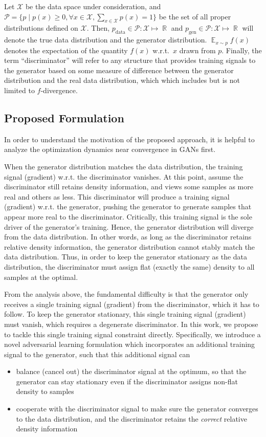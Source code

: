 \documentclass[a4paper]{article}
\newcommand{\pd}{p_\text{data}}
\newcommand{\pg}{p_\text{gen}}
\DeclareMathOperator*{\E}{\mathbb{E}}
\DeclareMathOperator{\R}{\mathbb{R}}
\begin{document}
Let $\mathcal{X}$ be the data space under consideration, and $\mathcal{P} = \{ p \mid p(x) \geq 0, \forall x \in \mathcal{X}, \sum_{x \in \mathcal{X}} p(x) = 1 \}$ be the set of all proper distributions defined on $\mathcal{X}$.
Then, $\pd \in \mathcal{P}: \mathcal{X} \mapsto \R$ and $\pg \in \mathcal{P}: \mathcal{X} \mapsto \R$ will denote the true data distribution and the generator distribution.
$\E_{x \sim p} f(x)$ denotes the expectation of the quantity $f(x)$ w.r.t.~$x$ drawn from $p$.
Finally, the term ``discriminator'' will refer to any structure that provides training signals to the generator based on some measure of difference between the generator distribution and the real data distribution, which which includes but is not limited to $f$-divergence.

\subsection{Proposed Formulation}
In order to understand the motivation of the proposed approach, it is helpful to analyze the optimization dynamics near convergence in GANs first.

When the generator distribution matches the data distribution, 
the training signal (gradient) w.r.t. the discriminator vanishes.
At this point, assume the discriminator still retains density information, and views some samples as more real and others as less.
This discriminator will produce a training signal (gradient) w.r.t. the generator, pushing the generator to generate samples that appear more real to the discriminator.
Critically, this training signal is the sole driver of the generator's training. 
Hence, the generator distribution will diverge from the data distribution.
In other words, as long as the discriminator retains relative density information, the generator distribution cannot stably match the data distribution.
Thus, in order to keep the generator stationary as the data distribution, the discriminator must assign flat (exactly the same) density to all samples at the optimal. 

From the analysis above, the fundamental difficulty is that the generator only receives a single training signal (gradient) from the discriminator, which it has to follow.
To keep the generator stationary, this single training signal (gradient) must vanish, which requires a degenerate discriminator. In this work, we propose to tackle this single training signal constraint directly.
Specifically, we introduce a novel adversarial learning formulation which incorporates an additional training signal to the generator, such that this additional signal can 
\begin{itemize}
	\item balance (cancel out) the discriminator signal at the optimum, so that the generator can stay stationary even if the discriminator assigns non-flat density to samples
	\item cooperate with the discriminator signal to make sure the generator converges to the data distribution, and the discriminator retains the \textit{correct} relative density information 
\end{itemize} 
\end{document}
